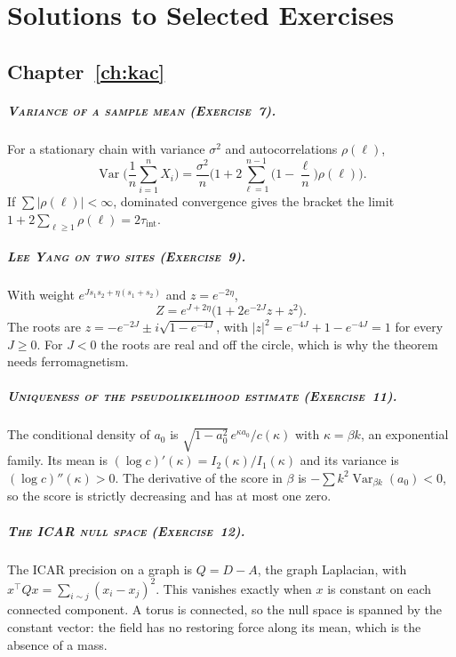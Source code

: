 \chapter{Solutions to Selected Exercises}\label{ch:solutions}

\section*{Chapter~\ref{ch:kac}}

\paragraph{\normalfont\scshape Variance of a sample mean (Exercise~7).} For a stationary chain with variance $\sigma^2$ and autocorrelations $\rho(\ell)$,
\[
\operatorname{Var}\Big(\frac1n\sum_{i=1}^nX_i\Big)=\frac{\sigma^2}{n}\Big(1+2\sum_{\ell=1}^{n-1}\Big(1-\frac \ell n\Big)\rho(\ell)\Big).
\]
If $\sum|\rho(\ell)|<\infty$, dominated convergence gives the bracket the limit $1+2\sum_{\ell\ge1}\rho(\ell)=2\tau_{\mathrm{int}}$.

\paragraph{\normalfont\scshape Lee Yang on two sites (Exercise~9).} With weight $e^{Js_1s_2+\eta(s_1+s_2)}$ and $z=e^{-2\eta}$,
\[
Z=e^{J+2\eta}\big(1+2e^{-2J}z+z^2\big).
\]
The roots are $z=-e^{-2J}\pm i\sqrt{1-e^{-4J}}$, with $|z|^2=e^{-4J}+1-e^{-4J}=1$ for every $J\ge0$. For $J<0$ the roots are real and off the circle, which is why the theorem needs ferromagnetism.

\paragraph{\normalfont\scshape Uniqueness of the pseudolikelihood estimate (Exercise~11).} The conditional density of $a_0$ is $\sqrt{1-a_0^2}\,e^{\kappa a_0}/c(\kappa)$ with $\kappa=\beta k$, an exponential family. Its mean is $(\log c)'(\kappa)=I_2(\kappa)/I_1(\kappa)$ and its variance is $(\log c)''(\kappa)>0$. The derivative of the score in $\beta$ is $-\sum k^2\operatorname{Var}_{\beta k}(a_0)<0$, so the score is strictly decreasing and has at most one zero.

\paragraph{\normalfont\scshape The ICAR null space (Exercise~12).} The ICAR precision on a graph is $Q=D-A$, the graph Laplacian, with $x^\top Qx=\sum_{i\sim j}(x_i-x_j)^2$. This vanishes exactly when $x$ is constant on each connected component. A torus is connected, so the null space is spanned by the constant vector: the field has no restoring force along its mean, which is the absence of a mass.

